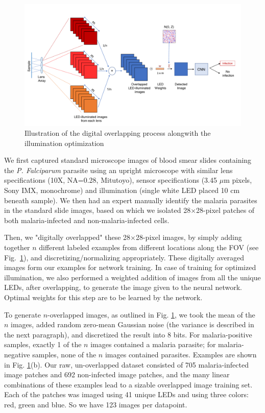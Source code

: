 \documentclass{article}
\begin{document}
\begin{figure}
\centering
\includegraphics[width=\linewidth]{590L1.pdf}
\caption{Illustration of the digital overlapping process alongwith the illumination optimization}
\label{digitaloverlap}
\end{figure}

We first captured standard microscope images of blood smear slides containing the {\it P. Falciparum} parasite using an upright microscope with similar lens specifications (10X, NA=0.28, Mitutoyo), sensor specifications (3.45 $\mu$m pixels, Sony IMX, monochrome) and illumination (single white LED placed 10 cm beneath sample). We then had an expert manually identify the malaria parasites in the standard slide images, based on which we isolated 28$\times$28-pixel patches of both malaria-infected and non-malaria-infected cells.

Then, we "digitally overlapped" these 28$\times$28-pixel images, by simply adding together $n$ different labeled examples from different locations along the FOV (see Fig.~\ref{digitaloverlap}), and discretizing/normalizing appropriately. These digitally averaged images form our examples for network training. In case of training for optimized illumination, we also performed a weighted addition of images from all the unique LEDs, after overlapping, to generate the image given to the neural network. Optimal weights for this step are to be learned by the network.

To generate $n$-overlapped images, as outlined in Fig. \ref{digitaloverlap}, we took the mean of the $n$ images, added random zero-mean Gaussian noise (the variance is described in the next paragraph), and discretized the result into 8 bits. For malaria-positive samples, exactly 1 of the $n$ images contained a malaria parasite; for malaria-negative samples, none of the $n$ images contained parasites. Examples are shown in Fig. \ref{digitaloverlap}(b). Our raw, un-overlapped dataset consisted of 705 malaria-infected image patches and 692 non-infected image patches, and the many linear combinations of these examples lead to a sizable overlapped image training set. Each of the patches was imaged using 41 unique LEDs and using three colors: red, green and blue. So we have 123 images per datapoint.
\end{document}

